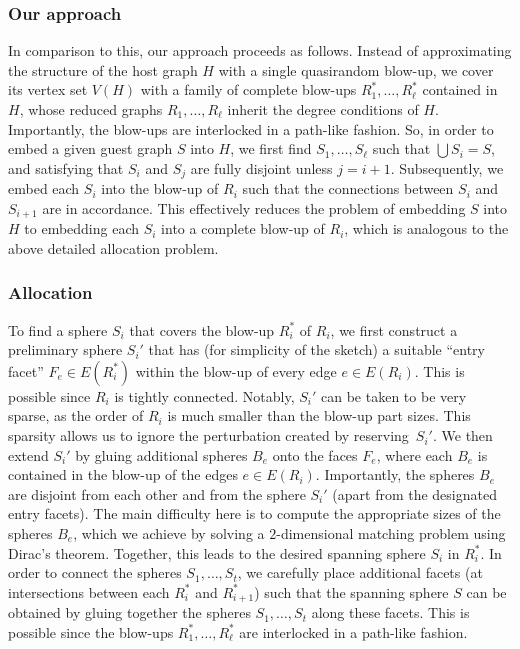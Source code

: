 \documentclass[12pt,reqno]{amsart}
\theoremstyle{plain}
\theoremstyle{definition}
\numberwithin{equation}{section}
\begin{document}
	\subsubsection*{Our approach}
	In comparison to this, our approach proceeds as follows.
	Instead of approximating the structure of the host graph $H$ with a single quasirandom blow-up, we cover its vertex set $V(H)$ with a family of complete blow-ups $R_1^\ast,\dots,R_\ell^\ast$ contained in $H$, whose reduced graphs $R_1,\dots,R_\ell$ inherit the degree conditions of $H$.
	Importantly, the blow-ups are interlocked in a path-like fashion.
	So, in order to embed a given guest graph $S$ into $H$, we first find $S_1,\dots,S_\ell$ such that $\bigcup S_i = S$, and satisfying that $S_i$ and $S_j$ are fully disjoint unless $j=i+1$. Subsequently, we embed each $S_i$ into the blow-up of $R_i$ such that the connections between $S_i$ and $S_{i+1}$ are in accordance.
	This effectively reduces the problem of embedding $S$ into $H$ to embedding each $S_i$ into a complete blow-up of $R_i$, which is analogous to the above detailed allocation problem.
	
	\subsubsection*{Allocation}
	To find a sphere $S_i$ that covers the blow-up $R_i^\ast$ of $R_i$, we first construct a preliminary sphere $S_i'$ that has (for simplicity of the sketch) a suitable ``entry facet'' $F_e \in E(R_i^\ast)$ within the blow-up of every edge $e \in E(R_i)$.
	This is possible since $R_i$ is tightly connected.
	Notably, $S_i'$ can be taken to be very sparse, as the order of $R_i$ is much smaller than the blow-up part sizes.
	This sparsity allows us to ignore the perturbation created by reserving~$S_i'$.
	We then extend $S_i'$ by gluing additional spheres $B_e$ onto the faces $F_e$, where each $B_e$ is contained in the blow-up of the edges $e \in E(R_i)$.
	Importantly, the spheres $B_e$ are disjoint from each other and from the sphere $S_i'$ (apart from the designated entry facets).
	The main difficulty here is to compute the appropriate sizes of the spheres $B_e$, which we achieve by solving a $2$-dimensional matching problem using Dirac's theorem.
	Together, this leads to the desired spanning sphere $S_i$ in $R^\ast_i$.
	In order to connect the spheres $S_1,\dots,S_t$, we carefully place additional facets (at intersections between each $R_i^\ast$ and $R^\ast_{i+1}$) such that the spanning sphere $S$ can be obtained by gluing together the spheres $S_1,\dots,S_t$ along these facets.
	This is possible since the blow-ups $R_1^\ast, \dots, R_\ell^\ast$ are interlocked in a path-like fashion.
	
\end{document}
